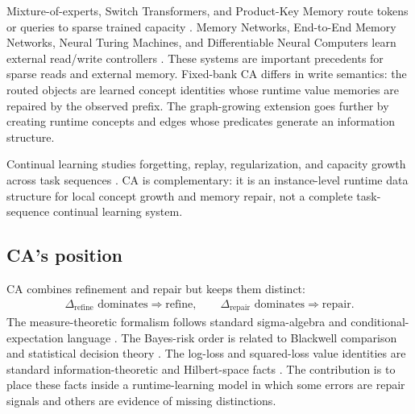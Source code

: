 Mixture-of-experts, Switch Transformers, and Product-Key Memory route tokens or queries to sparse trained capacity \citep{shazeer2017outrageously,fedus2022switch,lample2019large}. Memory Networks, End-to-End Memory Networks, Neural Turing Machines, and Differentiable Neural Computers learn external read/write controllers \citep{weston2015memory,sukhbaatar2015end,graves2014neural,graves2016hybrid}. These systems are important precedents for sparse reads and external memory. Fixed-bank CA differs in write semantics: the routed objects are learned concept identities whose runtime value memories are repaired by the observed prefix. The graph-growing extension goes further by creating runtime concepts and edges whose predicates generate an information structure.

Continual learning studies forgetting, replay, regularization, and capacity growth across task sequences \citep{kirkpatrick2017overcoming,lopezpaz2017gradient,rusu2016progressive,yoon2018lifelong}. CA is complementary: it is an instance-level runtime data structure for local concept growth and memory repair, not a complete task-sequence continual learning system.

\subsection{CA's position}

CA combines refinement and repair but keeps them distinct:
\begin{align*}
\Delta_{\mathrm{refine}}\text{ dominates}\Rightarrow\text{refine},
\qquad
\Delta_{\mathrm{repair}}\text{ dominates}\Rightarrow\text{repair}.
\end{align*}
The measure-theoretic formalism follows standard sigma-algebra and conditional-expectation language \citep{billingsley1995probability,kallenberg2002foundations}. The Bayes-risk order is related to Blackwell comparison and statistical decision theory \citep{blackwell1953equivalent,berger1985statistical}. The log-loss and squared-loss value identities are standard information-theoretic and Hilbert-space facts \citep{cover2006elements,gneiting2007strictly}. The contribution is to place these facts inside a runtime-learning model in which some errors are repair signals and others are evidence of missing distinctions.
